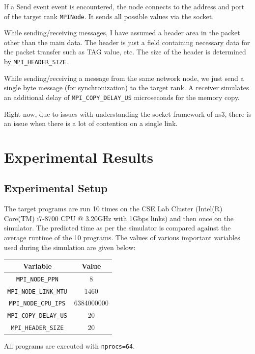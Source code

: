 \documentclass[10pt,conference]{IEEEtran}
\begin{document}
If a Send event event is encountered, the node connects to the address and port
of the target rank \texttt{MPINode}. It sends all possible values via the
socket.

While sending/receiving messages, I have assumed a header area in the packet
other than the main data. The header is just a field containing necessary data
for the packet transfer such as TAG value, etc. The size of the header is
determined by \texttt{MPI\_HEADER\_SIZE}.

While sending/receiving a message from the same network node, we just send a
single byte message (for synchronization) to the target rank. A receiver
simulates an additional delay of \texttt{MPI\_COPY\_DELAY\_US} microseconds for
the memory copy.

Right now, due to issues with understanding the socket framework of ns3, there
is an issue when there is a lot of contention on a single link.

\section{Experimental Results}
\subsection{Experimental Setup}
The target programs are run 10 times on the CSE Lab Cluster (Intel(R) Core(TM)
i7-8700 CPU @ 3.20GHz with 1Gbps links) and then once on the simulator. The
predicted time as per the simulator is compared against the average runtime of
the 10 programs. The values of various important variables used during the
simulation are given below:

\begin{center}
  \begin{tabular}{ |c|c| }
    \hline
    Variable & Value \\
    \hline
    \texttt{MPI\_NODE\_PPN} & 8 \\
    \texttt{MPI\_NODE\_LINK\_MTU} & 1460 \\
    \texttt{MPI\_NODE\_CPU\_IPS} & 6384000000 \\
    \texttt{MPI\_COPY\_DELAY\_US} & 20 \\
    \texttt{MPI\_HEADER\_SIZE} & 20 \\
    \hline
  \end{tabular}
\end{center}

All programs are executed with \texttt{nprocs=64}.
\end{document}
